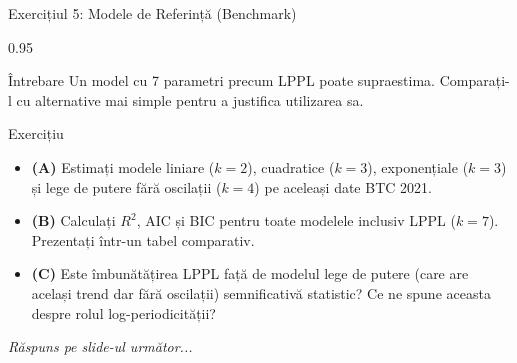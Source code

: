 \documentclass[9pt, aspectratio=169, t]{beamer}
\begin{document}
\begin{frame}{Exercițiul 5: Modele de Referință (Benchmark)}
    \begin{cminipage}{0.95\textwidth}
    \begin{alertblock}{Întrebare}
        Un model cu 7 parametri precum LPPL poate supraestima. Comparați-l cu alternative mai simple pentru a justifica utilizarea sa.
    \end{alertblock}

    \vspace{0.2cm}

    \begin{block}{Exercițiu}
        \begin{itemize}\setlength{\itemsep}{3pt}
            \item \textcolor{MainBlue}{\textbf{(A)}} Estimați modele liniare ($k=2$), cuadratice ($k=3$), exponențiale ($k=3$) și lege de putere fără oscilații ($k=4$) pe aceleași date BTC 2021.
            \item \textcolor{MainBlue}{\textbf{(B)}} Calculați $R^2$, AIC și BIC pentru toate modelele inclusiv LPPL ($k=7$). Prezentați într-un tabel comparativ.
            \item \textcolor{MainBlue}{\textbf{(C)}} Este îmbunătățirea LPPL față de modelul lege de putere (care are același trend dar fără oscilații) semnificativă statistic? Ce ne spune aceasta despre rolul log-periodicității?
        \end{itemize}
    \end{block}

    \vspace{0.15cm}

    \begin{center}
        \textit{Răspuns pe slide-ul următor...}
    \end{center}
    \end{cminipage}
\end{frame}
\end{document}
